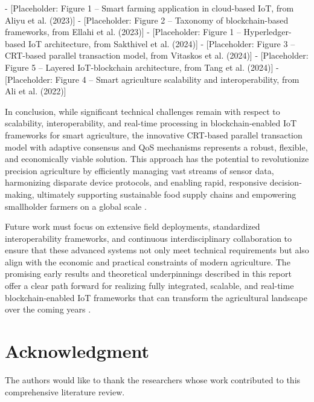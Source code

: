 \documentclass[12pt,onecolumn]{IEEEtran} %
\begin{document}
- [Placeholder: Figure 1 – Smart farming application in cloud-based IoT, from Aliyu et al. (2023)\cite{aliyu2023blockchainbasedsmartfarm}]
- [Placeholder: Figure 2 – Taxonomy of blockchain-based frameworks, from Ellahi et al. (2023)\cite{ellahi2023blockchainbasedframeworksfor}]
- [Placeholder: Figure 1 – Hyperledger-based IoT architecture, from Sakthivel et al. (2024)\cite{sakthivel2024enhancingtransparencyand}]
- [Placeholder: Figure 3 – CRT-based parallel transaction model, from Vitaskos et al. (2024)\cite{vitaskos2024blockchainandinternet}]
- [Placeholder: Figure 5 – Layered IoT-blockchain architecture, from Tang et al. (2024)\cite{tang2024assessingblockchainand}]
- [Placeholder: Figure 4 – Smart agriculture scalability and interoperability, from Ali et al. (2022)\cite{ali2022blockchainenabledarchitecture}]

In conclusion, while significant technical challenges remain with respect to scalability, interoperability, and real-time processing in blockchain-enabled IoT frameworks for smart agriculture, the innovative CRT-based parallel transaction model with adaptive consensus and QoS mechanisms represents a robust, flexible, and economically viable solution. This approach has the potential to revolutionize precision agriculture by efficiently managing vast streams of sensor data, harmonizing disparate device protocols, and enabling rapid, responsive decision-making, ultimately supporting sustainable food supply chains and empowering smallholder farmers on a global scale \cite{huang2025digitaltraceabilityin, thiruvenkatasamy2025anonlinetool, huang2025digitaltraceabilityin, irfan2025aniotdrivensmart}.

Future work must focus on extensive field deployments, standardized interoperability frameworks, and continuous interdisciplinary collaboration to ensure that these advanced systems not only meet technical requirements but also align with the economic and practical constraints of modern agriculture. The promising early results and theoretical underpinnings described in this report offer a clear path forward for realizing fully integrated, scalable, and real-time blockchain-enabled IoT frameworks that can transform the agricultural landscape over the coming years \cite{thiruvenkatasamy2025anonlinetool, alazzai2024smartagriculturesolutions}.


\section*{Acknowledgment}
The authors would like to thank the researchers whose work contributed to this comprehensive literature review.



\end{document}
